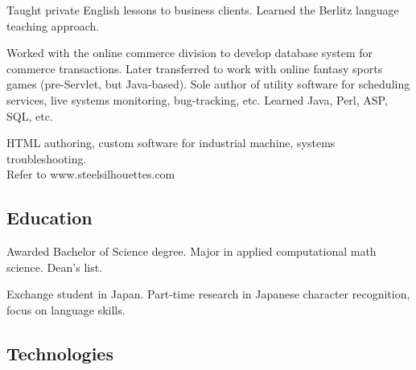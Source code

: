 \documentclass{article}
\begin{document}
  
Taught private English lessons to business clients.  Learned the Berlitz
language teaching approach.

  
Worked with the online commerce division to develop database system for
commerce transactions.  Later transferred to work with online fantasy sports
games (pre-Servlet, but Java-based).  Sole author of utility software for
scheduling services, live systems monitoring, bug-tracking, etc.  Learned Java,
Perl, ASP, SQL, etc.

 
HTML authoring, custom software for industrial machine, systems
troubleshooting. \\ Refer to www.\-steelsilhouettes.\-com



\subsection*{Education}

Awarded Bachelor of Science degree.  Major in applied computational math
science.  Dean's list.

Exchange student in Japan.  Part-time research in Japanese character
recognition, focus on language skills.

\subsection*{Technologies}
\end{document}
